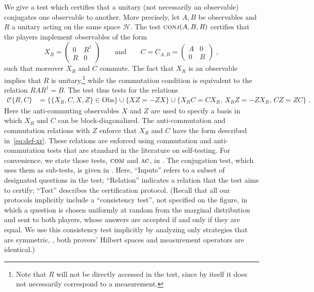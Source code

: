 \documentclass{toc}
\newcommand{\setft}[1]{\mathrm{#1}}
\newcommand{\Obs}{\setft{Obs}}
\newcommand{\mH}{\mathcal{H}}
\newcommand{\conj}{\textsc{conj}}
\newcommand{\comt}{\textsc{com}}
\newcommand{\act}{\textsc{ac}}
\begin{document}
We give a test which certifies that a unitary (not necessarily an observable) conjugates one observable to another. More precisely, let $A,B$ be observables and $R$ a unitary acting on the same space $\mH$. The test $\conj(A,B,R)$ certifies that the players implement observables of the form
\begin{equation}\label{eq:def-xr}
X_R = \begin{pmatrix} 0 & R^\dagger\\ R & 0 \end{pmatrix}\qquad \text{and}\qquad C = C_{A,B} = \begin{pmatrix} A & 0\\ 0 & B \end{pmatrix}\;,
\end{equation}
such that moreover $X_R$ and $C$ commute. The fact that $X_R$ is an observable implies that $R$ is unitary,\footnote{Note that $R$ will not be directly accessed in the test, since by itself it does not necessarily correspond to a measurement.} while the commutation condition is equivalent to the relation $RAR^\dagger = B$. The test thus tests for the relations
\begin{align*}
 \mathcal{C}\{R,C\} &= \big\{ \{X_R,C,X,Z\}\in \Obs\big\} \cup \big\{XZ=-ZX\big\}
\cup \big\{ X_R C = C X_R,\, X_RZ=-Z X_R,\, C Z=ZC\big\}\;.
\end{align*}
Here the anti-commuting observables $X$ and $Z$ are used to specify a basis in which $X_R$ and $C$ can be block-diagonalized. The anti-commutation and commutation relations with $Z$ enforce that $X_R$ and $C$ have the form described in~\eqref{eq:def-xr}.
These relations are enforced using commutation and anti-commutation tests that are standard in the literature on self-testing. For convenience, we state those tests, $\comt$ and $\act$, in . The conjugation test, which uses them as sub-tests, is given in . Here, ``Inputs'' refers to a subset of designated questions in the test; ``Relation'' indicates a relation that the test aims to certify; ``Test'' describes the certification protocol. (Recall that all our protocols implicitly include a ``consistency test'', not specified on the figure, in which a question is chosen uniformly at random from the marginal distribution and sent to both players, whose answers are accepted if and only if they are equal. We use this consistency test implicitly by analyzing only strategies that are symmetric, \ie, both provers' Hilbert spaces and measurement operators are identical.)
\end{document}
